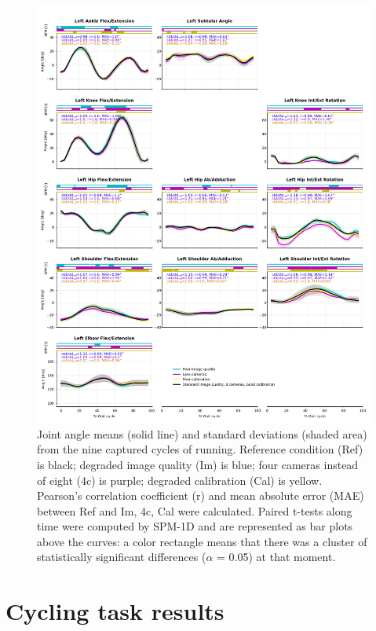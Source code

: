 \begin{figure}[!ht]
	\centering
	\def\svgwidth{1\columnwidth}
	\fontsize{10pt}{10pt}\selectfont
	\includegraphics[height=\dimexpr\textheight-145pt]{"../Annexes/Figures/Fig_RunRobust.png"}
	\caption{Joint angle means (solid line) and standard deviations (shaded area) from the nine captured cycles of running. Reference condition (Ref) is black; degraded image quality (Im) is blue; four cameras instead of eight (4c) is purple; degraded calibration (Cal) is yellow. Pearson’s correlation coefficient (r) and mean absolute error (MAE) between Ref and Im, 4c, Cal were calculated. Paired t-tests along time were computed by SPM-1D and are represented as bar plots above the curves: a color rectangle means that there was a cluster of statistically significant differences (\(\alpha\) = 0.05) at that moment.}
	\label{fig_runrobust}
\end{figure}

\clearpage
\section{Cycling task results}


